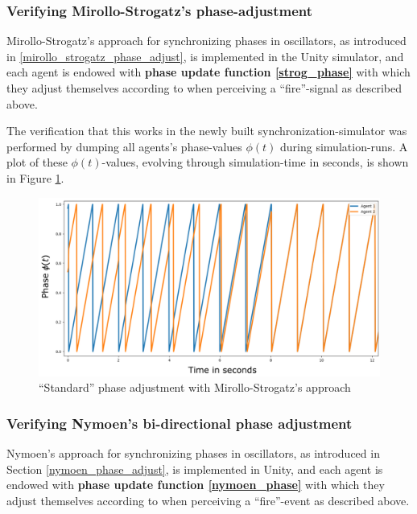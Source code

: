 	
		\subsubsection{Verifying Mirollo-Strogatz's phase-adjustment} %
		
		Mirollo-Strogatz's approach for synchronizing phases in oscillators, as introduced in \ref{mirollo_strogatz_phase_adjust}, is implemented in the Unity simulator, and each agent is endowed with \textbf{phase update function \eqref{strog_phase}} with which they adjust themselves according to when perceiving a ``fire''-signal as described above.
		
		The verification that this works in the newly built synchronization-simulator was performed by dumping all agents's phase-values $\phi(t)$ during simulation-runs. A plot of these $\phi(t)$-values, evolving through simulation-time in seconds, is shown in Figure \ref{fig:strog_phase}.
		
		\begin{figure}[h]
			\centering
			\includegraphics[width=0.9\linewidth]{Assets/DocSegments/Chapters/ExperimentsAndResults/Figures/Validations/MirolloStrogatzPhaseAdjustmentSecondTry.pdf}
			\caption[Illustration of Mirollo \& Strogatz's ``standard'' phase adjustment ($Adj_{\phi}$) method.]{``Standard'' phase adjustment with Mirollo-Strogatz's approach}
			\label{fig:strog_phase}
		\end{figure}
		
		
		\subsubsection{Verifying Nymoen's bi-directional phase adjustment} %
		
		Nymoen's approach for synchronizing phases in oscillators, as introduced in Section \ref{nymoen_phase_adjust}, is implemented in Unity, and each agent is endowed with \textbf{phase update function \eqref{nymoen_phase}} with which they adjust themselves according to when perceiving a ``fire''-event as described above.
		
